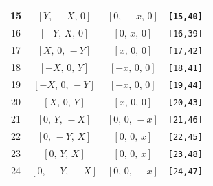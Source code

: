 \documentclass[fleqn,8pt]{jsarticle}
\begin{document}
\begin{longtable}{cccc}
15 & $\left[ Y,\, - X,\, 0 \right]$ & $\left[ 0,\, - x,\, 0 \right]$ & {\tt [15,40]} \\ \hline
16 & $\left[ - Y,\, X,\, 0 \right]$ & $\left[ 0,\, x,\, 0 \right]$ & {\tt [16,39]} \\ \hline
17 & $\left[ X,\, 0,\, - Y \right]$ & $\left[ x,\, 0,\, 0 \right]$ & {\tt [17,42]} \\ \hline
18 & $\left[ - X,\, 0,\, Y \right]$ & $\left[ - x,\, 0,\, 0 \right]$ & {\tt [18,41]} \\ \hline
19 & $\left[ - X,\, 0,\, - Y \right]$ & $\left[ - x,\, 0,\, 0 \right]$ & {\tt [19,44]} \\ \hline
20 & $\left[ X,\, 0,\, Y \right]$ & $\left[ x,\, 0,\, 0 \right]$ & {\tt [20,43]} \\ \hline
21 & $\left[ 0,\, Y,\, - X \right]$ & $\left[ 0,\, 0,\, - x \right]$ & {\tt [21,46]} \\ \hline
22 & $\left[ 0,\, - Y,\, X \right]$ & $\left[ 0,\, 0,\, x \right]$ & {\tt [22,45]} \\ \hline
23 & $\left[ 0,\, Y,\, X \right]$ & $\left[ 0,\, 0,\, x \right]$ & {\tt [23,48]} \\ \hline
24 & $\left[ 0,\, - Y,\, - X \right]$ & $\left[ 0,\, 0,\, - x \right]$ & {\tt [24,47]} \\
\end{longtable}
\renewcommand{\arraystretch}{1.2}
\end{document}
